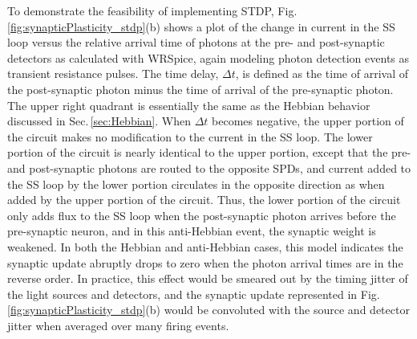 \documentclass[twocolumn]{article}
\begin{document}
To demonstrate the feasibility of implementing STDP, Fig.\,\ref{fig:synapticPlasticity_stdp}(b) shows a plot of the change in current in the SS loop versus the relative arrival time of photons at the pre- and post-synaptic detectors as calculated with WRSpice, again modeling photon detection events as transient resistance pulses. The time delay, $\Delta t$, is defined as the time of arrival of the post-synaptic photon minus the time of arrival of the pre-synaptic photon. The upper right quadrant is essentially the same as the Hebbian behavior discussed in Sec.\,\ref{sec:Hebbian}. When $\Delta t$ becomes negative, the upper portion of the circuit makes no modification to the current in the SS loop. The lower portion of the circuit is nearly identical to the upper portion, except that the pre- and post-synaptic photons are routed to the opposite SPDs, and current added to the SS loop by the lower portion circulates in the opposite direction as when added by the upper portion of the circuit. Thus, the lower portion of the circuit only adds flux to the SS loop when the post-synaptic photon arrives before the pre-synaptic neuron, and in this anti-Hebbian event, the synaptic weight is weakened. In both the Hebbian and anti-Hebbian cases, this model indicates the synaptic update abruptly drops to zero when the photon arrival times are in the reverse order. In practice, this effect would be smeared out by the timing jitter of the light sources and detectors, and the synaptic update represented in Fig.\,\ref{fig:synapticPlasticity_stdp}(b) would be convoluted with the source and detector jitter when averaged over many firing events.
\end{document}
